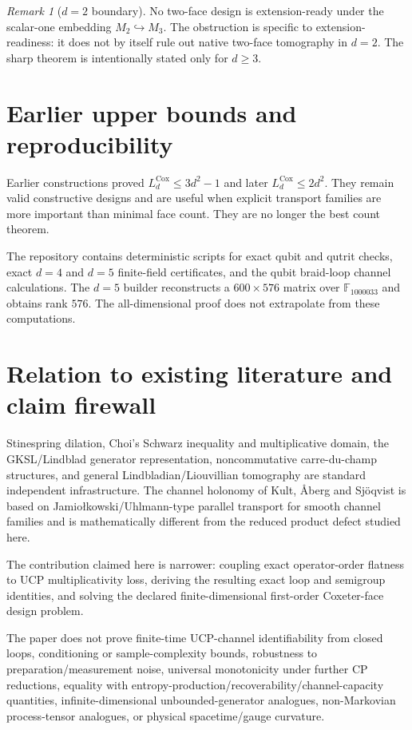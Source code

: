 \documentclass[11pt]{article}
\theoremstyle{definition}
\theoremstyle{remark}
\newtheorem{remark}[theorem]{Remark}
\newcommand{\Cox}{\mathrm{Cox}}
\begin{document}
\begin{remark}[$d=2$ boundary]\label{rem:d2}
No two-face design is extension-ready under the scalar-one embedding $M_2\hookrightarrow M_3$. The obstruction is specific to extension-readiness: it does not by itself rule out native two-face tomography in $d=2$. The sharp theorem is intentionally stated only for $d\ge3$.
\end{remark}

\section{Earlier upper bounds and reproducibility}
Earlier constructions proved $L_d^{\Cox}\le3d^2-1$ and later $L_d^{\Cox}\le2d^2$. They remain valid constructive designs and are useful when explicit transport families are more important than minimal face count. They are no longer the best count theorem.

The repository contains deterministic scripts for exact qubit and qutrit checks, exact $d=4$ and $d=5$ finite-field certificates, and the qubit braid-loop channel calculations. The $d=5$ builder reconstructs a $600\times576$ matrix over $\mathbb F_{1000033}$ and obtains rank $576$. The all-dimensional proof does not extrapolate from these computations.

\section{Relation to existing literature and claim firewall}
Stinespring dilation, Choi's Schwarz inequality and multiplicative domain, the GKSL/Lindblad generator representation, noncommutative carre-du-champ structures, and general Lindbladian/Liouvillian tomography are standard independent infrastructure. The channel holonomy of Kult, \AA berg and Sj\"oqvist is based on Jamio\l kowski/Uhlmann-type parallel transport for smooth channel families and is mathematically different from the reduced product defect studied here.

The contribution claimed here is narrower: coupling exact operator-order flatness to UCP multiplicativity loss, deriving the resulting exact loop and semigroup identities, and solving the declared finite-dimensional first-order Coxeter-face design problem.

The paper does not prove finite-time UCP-channel identifiability from closed loops, conditioning or sample-complexity bounds, robustness to preparation/measurement noise, universal monotonicity under further CP reductions, equality with entropy-production/recoverability/channel-capacity quantities, infinite-dimensional unbounded-generator analogues, non-Markovian process-tensor analogues, or physical spacetime/gauge curvature.
\end{document}
